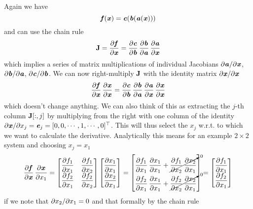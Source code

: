\documentclass[paper=a4,11pt,headsepline]{scrartcl}
\begin{document}
Again we have
\begin{equation}
    \ve f(\ve x) = \ve c(\ve b(\ve a(\ve x)))
\end{equation}
and can use the chain rule
\begin{equation}
    \ma J=\pd{\ve f}{\ve x} = \pd{\ve c}{\ve b}\,\pd{\ve b}{\ve a}\,\pd{\ve a}{\ve x}
\end{equation}
which implies a series of matrix multiplications of individual Jacobians $\pdi{\ve
a}{\ve x}$, $\pdi{\ve b}{\ve a}$, $\pdi{\ve c}{\ve b}$.
We can now right-multiply $\ma J$ with the identity
matrix $\pdi{\ve x}{\ve x}$
\begin{equation}
    \pd{\ve f}{\ve x}\,\pd{\ve x}{\ve x} =
    \pd{\ve c}{\ve b}\,\pd{\ve b}{\ve a}\,\pd{\ve a}{\ve x}\,\pd{\ve x}{\ve x}
\end{equation}
which doesn't change anything. We can also think of this as extracting the
$j$-th column $\ma J[:,j]$ by multiplying from the right with one column of the
identity $\partial\ve x/\partial x_j = \ve e_j = \tp{[0,0,\cdots,1,\cdots, 0]}$.
This will thus select the $x_j$ w.r.t. to which we want to calculate the
derivative. Analytically this means for an example $2\times 2$ system and choosing
$x_j = x_1$
\begin{equation}
    \pd{\ve f}{\ve x}\,\pd{\ve x}{x_1}=
    \begin{bmatrix}
        \pd{f_1}{x_1} & \pd{f_1}{x_2} \\
        \pd{f_2}{x_1} & \pd{f_2}{x_2} \\
    \end{bmatrix}
    \begin{bmatrix}
        \pd{x_1}{x_1} \\
        \pd{x_2}{x_1} \\
    \end{bmatrix}
    =
    \begin{bmatrix}
        \pd{f_1}{x_1}\,\pd{x_1}{x_1} + \cancelto{0}{\pd{f_1}{x_2}\,\pd{x_2}{x_1}} \\
        \pd{f_2}{x_1}\,\pd{x_1}{x_1} + \cancelto{0}{\pd{f_2}{x_2}\,\pd{x_2}{x_1}} \\
    \end{bmatrix}
    =
    \begin{bmatrix}
        \pd{f_1}{x_1} \\
        \pd{f_2}{x_1} \\
    \end{bmatrix}
\end{equation}
%
if we note that $\pdi{x_2}{x_1}=0$ and that formally by the chain rule
\end{document}

